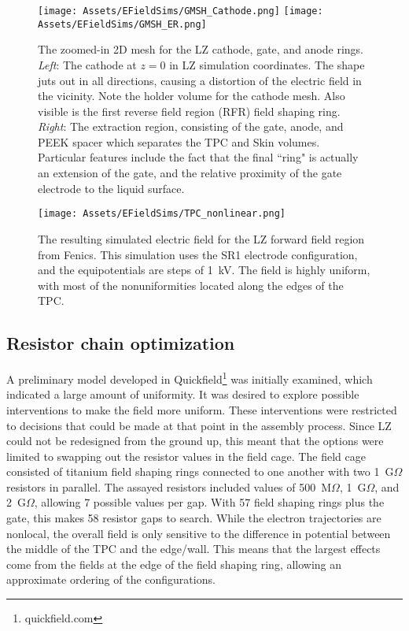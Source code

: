 \begin{figure}
    \centering
 \texttt{[image: Assets/EFieldSims/GMSH\_Cathode.png]}
     \texttt{[image: Assets/EFieldSims/GMSH\_ER.png]} 
     \caption[The zoomed-in 2D mesh for the LZ cathode, gate, and anode rings.]%
     {The zoomed-in 2D mesh for the LZ cathode, gate, and anode rings.
     \textit{Left}: The cathode at $z=0$ in LZ simulation coordinates. The shape juts out in all directions, causing a distortion of the electric field in the vicinity. Note the holder volume for the cathode mesh.
     Also visible is the first reverse field region (RFR) field shaping ring.
     \textit{Right}: The extraction region, consisting of the gate, anode, and PEEK spacer which separates the TPC and Skin volumes.
     Particular features include the fact that the final ``ring" is actually an extension of the gate, and the relative proximity of the gate electrode to the liquid surface.}
    \label{fig:gmsh_electrodes}
\end{figure}
\begin{figure}
    \centering
    \texttt{[image: Assets/EFieldSims/TPC\_nonlinear.png]}
    \caption[The resulting simulated electric field for the LZ forward field region from Fenics.]%
    {The resulting simulated electric field for the LZ forward field region from Fenics.
    This simulation uses the SR1 electrode configuration, and the equipotentials are steps of 1~kV.
    The field is highly uniform, with most of the nonuniformities located along the edges of the TPC.}
    \label{fig:sim_tpc_field}
\end{figure}


\subsection{Resistor chain optimization}
A preliminary model developed in Quickfield\footnote{quickfield.com} was initially examined, which indicated a large amount of uniformity.
It was desired to explore possible interventions to make the field more uniform.
These interventions were restricted to decisions that could be made at that point in the assembly process.
Since LZ could not be redesigned from the ground up, this meant that the options were limited to swapping out the resistor values in the field cage.
The field cage consisted of titanium field shaping rings connected to one another with two 1~G$\Omega$ resistors in parallel.
The assayed resistors included values of 500~M$\Omega$, 1~G$\Omega$, and 2~G$\Omega$, allowing 7 possible values per gap. 
With 57 field shaping rings plus the gate, this makes 58 resistor gaps to search.
While the electron trajectories are nonlocal, the overall field is only sensitive to the difference in potential between the middle of the TPC and the edge/wall.
This means that the largest effects come from the fields at the edge of the field shaping ring, allowing an approximate ordering of the configurations.

